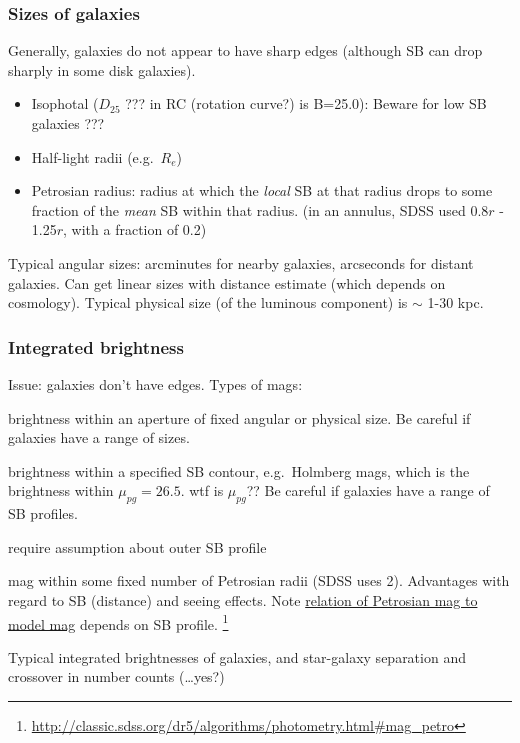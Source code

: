 \documentclass{article}
\newcommand{\mynotes}[1]{\textcolor{cadmiumorange}{#1}}
\begin{document}
\subsubsection{Sizes of galaxies}
Generally, galaxies do not appear to have sharp edges (although SB can
drop sharply in some disk galaxies).
\begin{itemize}
    \item Isophotal ($D_{25}$ \mynotes{???} in RC \mynotes{(rotation curve?)}
        is B=25.0): Beware for low SB galaxies \mynotes{???}
    \item Half-light radii (e.g.\ $R_{e}$)
    \item Petrosian radius: radius at which the \emph{local}
        SB at that radius drops to some fraction of the \emph{mean} SB within
        that radius.  (in an annulus, SDSS used 0.8$r$ - 1.25$r$, with a
        fraction of 0.2)
\end{itemize}
Typical angular sizes: arcminutes for nearby galaxies, arcseconds for
distant galaxies. Can get linear sizes with distance estimate
(which depends on cosmology). Typical physical size (of the luminous
component) is $\sim$ 1-30 kpc.

\subsubsection{Integrated brightness}\label{intb}
Issue: galaxies don't have edges. Types of mags:
\begin{description}[align=right, labelwidth=0.5in,
        labelindent=0.25in,
        leftmargin=1in]
    \item [Metric:] brightness within an aperture of fixed
        angular or physical size. Be careful if galaxies have a range
        of sizes.
    \item [Isophotal:] brightness within a specified SB
        contour, e.g.\ Holmberg mags, which is the brightness within
        $\mu_{pg} = 26.5$. \mynotes{wtf is $\mu_{pg}$??}
        Be careful if galaxies have a range of SB profiles.
    \item [Model:] require assumption about outer SB profile
    \item [Petrosian:]
        mag within some fixed number of Petrosian
        radii (SDSS uses 2).
        Advantages with regard to SB (distance) and seeing effects. Note
        \href{http://astronomy.nmsu.edu/holtz/a555/images/petrogal.htm}
        {relation of Petrosian mag to model mag} depends on SB profile.
        \footnote{\url{http://classic.sdss.org/dr5/algorithms/photometry.html\#mag_petro}}
\end{description}
Typical integrated brightnesses of galaxies, and star-galaxy separation
and crossover in number counts \mynotes{(\ldots yes?)}
\end{document}
